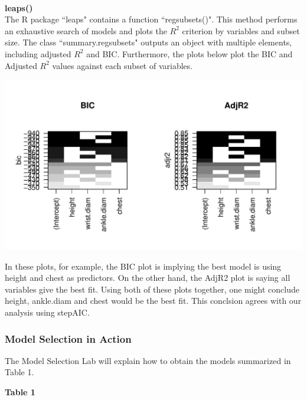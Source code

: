 \documentclass[11pt]{article}\usepackage[]{graphicx}\usepackage[]{color}
\makeatletter
\def\maxwidth{ %
  \ifdim\Gin@nat@width>\linewidth
    \linewidth
  \else
    \Gin@nat@width
  \fi
}
\newenvironment{knitrout}{}{} %
\makeatother
\begin{document}
\\

\textbf{leaps()}\\

The R package ``leaps" contains a function ``regsubsets()". This method performs an exhaustive search of models and plots the $R^2$ criterion by variables and subset size. The class ``summary.regsubsets" outputs an object with multiple elements, including adjusted $R^2$ and BIC. Furthermore, the plots below plot the  
BIC and Adjusted $R^2$ values against each subset of variables. 

\begin{knitrout}
\color{fgcolor}
\includegraphics[width=\maxwidth]{figure/leap} 

\end{knitrout}


In these plots, for example, the BIC plot is implying the best model is using height and chest as predictors. On the other hand, the AdjR2 plot is saying all variables give the best fit. Using both of these plots together, one might conclude height, ankle.diam and chest would be the best fit. This conclsion agrees with our analysis using stepAIC.

\subsubsection{Model Selection in Action}




The Model Selection Lab will explain how to obtain the models summarized in Table 1.     

\textbf{Table 1}\\
\end{document}
